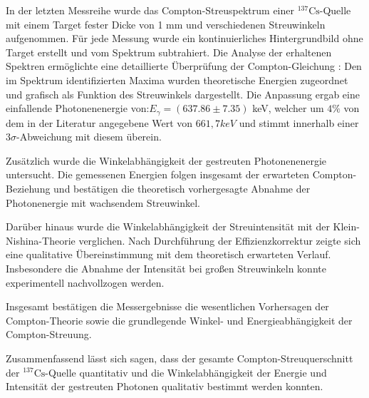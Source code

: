 In der letzten Messreihe wurde das Compton-Streuspektrum einer $^{137}\text{Cs}$-Quelle mit einem Target fester Dicke von 1 mm und verschiedenen Streuwinkeln aufgenommen. 
Für jede Messung wurde ein kontinuierliches Hintergrundbild ohne Target erstellt und vom Spektrum subtrahiert. 
Die Analyse der erhaltenen Spektren ermöglichte eine detaillierte Überprüfung der Compton-Gleichung : Den im Spektrum identifizierten Maxima wurden theoretische Energien zugeordnet und grafisch als Funktion des Streuwinkels dargestellt. 
Die Anpassung ergab eine einfallende Photonenenergie von:$E_{\gamma} = (637.86 \pm7.35)$ keV, welcher um $4\%$ von dem in der Literatur angegebene Wert von $661,7keV$ und stimmt innerhalb einer $3\sigma$-Abweichung mit diesem überein. 

Zusätzlich wurde die Winkelabhängigkeit der gestreuten Photonenenergie untersucht. 
Die gemessenen Energien folgen insgesamt der erwarteten Compton-Beziehung und bestätigen die theoretisch vorhergesagte Abnahme der Photonenergie mit wachsendem Streuwinkel.

Darüber hinaus wurde die Winkelabhängigkeit der Streuintensität mit der Klein-Nishina-Theorie verglichen. 
Nach Durchführung der Effizienzkorrektur zeigte sich eine qualitative Übereinstimmung mit dem theoretisch erwarteten Verlauf. 
Insbesondere die Abnahme der Intensität bei großen Streuwinkeln konnte experimentell nachvollzogen werden.

Insgesamt bestätigen die Messergebnisse die wesentlichen Vorhersagen der Compton-Theorie sowie die grundlegende Winkel- und Energieabhängigkeit der Compton-Streuung.

Zusammenfassend lässt sich sagen, dass der gesamte Compton-Streuquerschnitt der $^{137}\text{Cs}$-Quelle quantitativ und die Winkelabhängigkeit der Energie und Intensität der gestreuten Photonen qualitativ bestimmt werden konnten.

